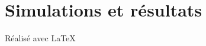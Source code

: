 \documentclass[a4paper]{report}
\theoremstyle{definition}
\begin{document}
\setcounter{tocdepth}{3}
\tableofcontents
\thispagestyle{empty}











\chapter{Simulations et r\'esultats}\label{simu}









\vfill
{\raggedleft R\'ealis\'e avec \LaTeX{} \par}
\end{document}
